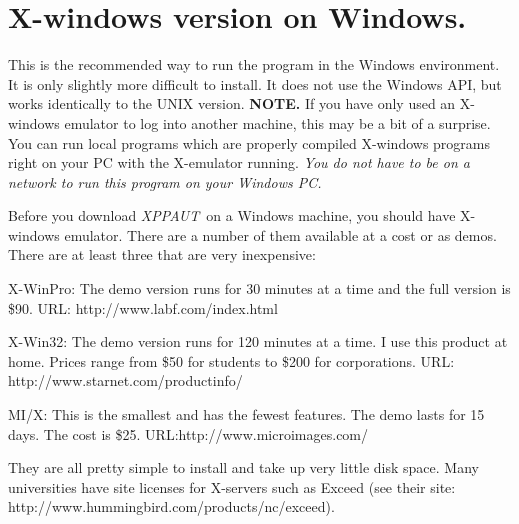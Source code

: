 \documentclass{article}
\newcommand{\XPP}{{\sl XPPAUT\, }}
\begin{document}
\section{X-windows version on Windows.} This is the recommended way
to run the program in the Windows environment. It is only slightly 
more difficult to
install. It does not use the Windows API, 
but works identically to the UNIX version. {\bf NOTE.} If you have
only used an X-windows emulator to log into another machine, this may
be a bit of a surprise. You can run local programs which are
properly compiled X-windows programs right on your PC with the
X-emulator running. {\em You do not have to be on a network to run
this program on your Windows PC.}  

Before you download \XPP on a Windows machine, you should have
X-windows emulator.  There are a number of them available at a cost or
as demos.  
There are at least three that are very inexpensive:
\begin{description}
\item{\sc X-WinPro:} The demo version runs for 30 minutes at a time and the
full version is \$90. URL: http://www.labf.com/index.html
\item{\sc X-Win32:} The demo version runs for 120 minutes at a time. I use
this product at home.  Prices range from \$50 for students to \$200
for corporations. URL: http://www.starnet.com/productinfo/
\item{\sc MI/X:} This is the smallest and has the fewest features. The
demo lasts for 15 days. The cost is \$25. 
URL:http://www.microimages.com/
\end{description}
They are all pretty simple to install and take up very little disk
space. Many universities have site licenses for X-servers such as {\sc
Exceed} (see their site: http://www.hummingbird.com/products/nc/exceed).   

\bigskip
\end{document}
